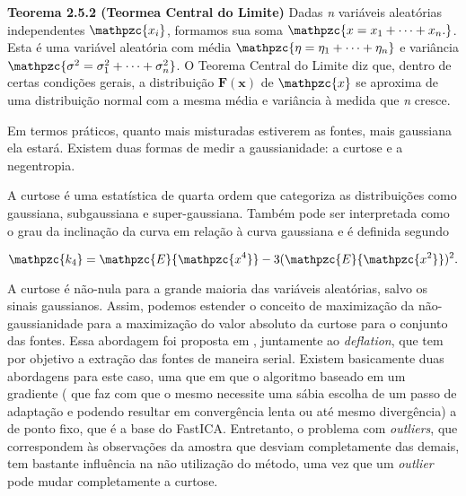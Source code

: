     \medskip
    
    \textbf{Teorema 2.5.2 (Teormea Central do Limite)} Dadas \textit{n} variáveis aleatórias independentes $\mathpzc{x_i}$, formamos sua soma $\mathpzc{x = x_1 + \dots + x_n.}$. Esta é uma variável aleatória com média $\mathpzc{\eta = \eta_1 + \dots + \eta_n}$ e variância $\mathpzc{\sigma^2 = \sigma_1^2 + \dots + \sigma_n^2}$. O Teorema Central do Limite diz que, dentro de certas condições gerais, a distribuição $\mathbf{F(x)}$ de $\mathpzc{x}$  se aproxima de uma distribuição normal com a mesma média e variância à medida que \textit{n} cresce.
    
    \medskip
    
    Em termos práticos, quanto mais misturadas estiverem as fontes, mais gaussiana ela estará. Existem duas formas de medir a gaussianidade: a curtose e a negentropia.

    
    A curtose é uma estatística de quarta ordem que categoriza as distribuições como gaussiana, subgaussiana e super-gaussiana. Também pode ser interpretada como o grau da inclinação da curva em relação à curva gaussiana e é definida segundo
    
    \begin{equation}
        \mathpzc{k_4} = \mathpzc{E}\{\mathpzc{x^4}\} - 3(\mathpzc{E}\{\mathpzc{x^2}\})^2.
    \end{equation} 
    
    A curtose é não-nula para a grande maioria das variáveis aleatórias, salvo os sinais gaussianos. Assim, podemos estender o conceito de maximização da não-gaussianidade para a maximização do valor absoluto da curtose para o conjunto das fontes. Essa abordagem foi proposta em \cite{ML}, juntamente ao \textit{deflation}, que tem por objetivo a extração das fontes de maneira serial. Existem basicamente duas abordagens para este caso, uma que em que o algoritmo baseado em um gradiente ( que faz com que o mesmo necessite uma sábia escolha de um passo de adaptação e podendo resultar em convergência lenta ou até mesmo divergência) a de ponto fixo, que é a base do FastICA. Entretanto, o problema com \textit{outliers}, que correspondem às observações da amostra que desviam completamente das demais, tem bastante influência na não utilização do método, uma vez que um \textit{outlier} pode mudar completamente a curtose.
    

